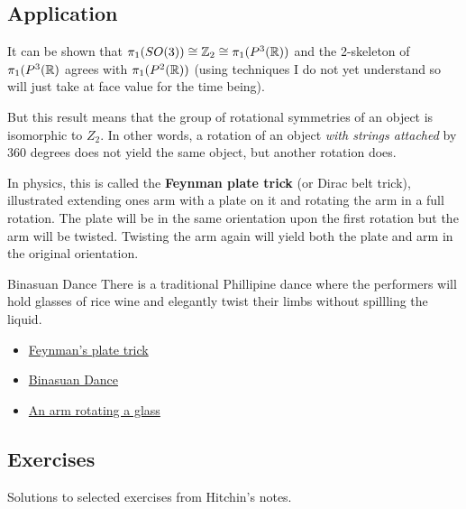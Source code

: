 \documentclass[10pt]{article}
\begin{document}
\subsection{Application}

It can be shown that $\pi_1(SO(3)) \cong \mathbb{Z}_2 \cong \pi_1(P^3(\mathbb{R}))$ and the
2-skeleton of $\pi_1(P^3(\mathbb{R})$ agrees with $\pi_1(P^2(\mathbb{R}))$ (using techniques I
do not yet understand so will just take at face value for the time being).

But this result means that the group of rotational symmetries of an object is
isomorphic to $Z_2$. In other words, a rotation of an object \textit{with
strings attached} by 360 degrees does not yield the same object, but another rotation does. 

In physics, this is called the \textbf{Feynman plate trick} (or Dirac belt trick), illustrated extending ones
arm with a plate on it and rotating the arm in a full rotation. The plate will
be in the same orientation upon the first rotation but the arm will be twisted.
Twisting the arm again will yield both the plate and arm in the original
orientation.

\begin{note}{Binasuan Dance}
	There is a traditional Phillipine dance where the performers will hold glasses
of rice wine and elegantly twist their limbs without spillling the liquid.
\end{note}

\begin{itemize}
	\item{\href{https://en.wikipedia.org/wiki/Plate_trick}{Feynman's plate trick}}
	\item{\href{https://www.youtube.com/watch?v=mOO_IQznZCQ}{Binasuan Dance}}
	\item{\href{https://www.youtube.com/watch?v=fTlbVLGBm3Q}{An arm rotating a glass}}
\end{itemize}

\subsection{Exercises}

Solutions to selected exercises from Hitchin's notes.
\end{document}
